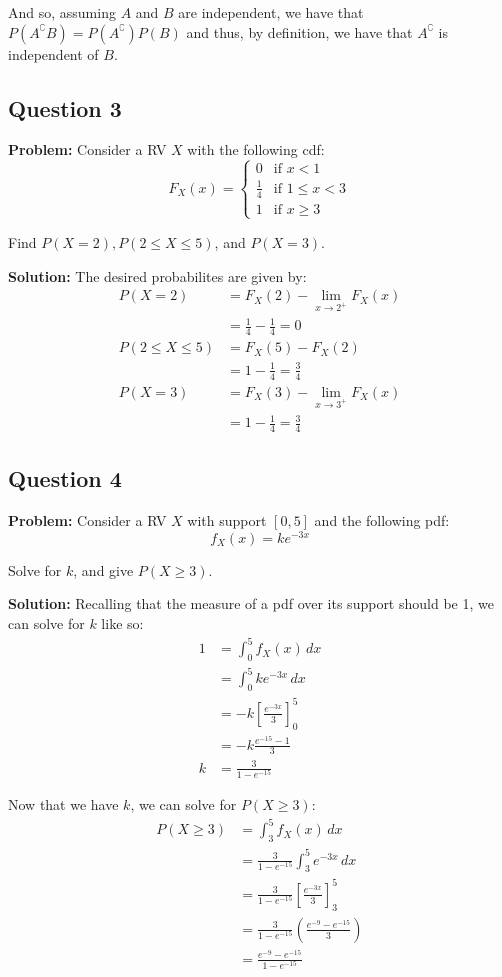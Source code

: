 \documentclass{article}
\newcommand*\eval[3]{\left[#1\right]_{#2}^{#3}}
\begin{document}
And so, assuming $A$ and $B$ are independent, we have that $P(A^\complement B)=P(A^\complement)P(B)$ and thus, by definition, we have that $A^\complement$ is independent of $B$.
\smallskip

\subsection*{Question 3}
\noindent\textbf{Problem:} Consider a RV $X$ with the following cdf:
$$F_X(x)=\begin{cases}
  0&\text{if }x<1\\
  \frac{1}{4}&\text{if }1\le x<3\\
  1&\text{if }x\ge3
\end{cases}$$

Find $P(X=2), P(2\le X\le5)$, and $P(X=3)$.
\smallskip

\noindent\textbf{Solution:} The desired probabilites are given by:
\begin{align*}
  P(X=2)&=F_X(2)-\lim_{x\to 2^+}F_X(x)\\
  &=\frac{1}{4}-\frac{1}{4}=\boxed{0}\\
  P(2\le X\le5)&=F_X(5)-F_X(2)\\
  &=1-\frac{1}{4}=\boxed{\frac{3}{4}}\\
  P(X=3)&=F_X(3)-\lim_{x\to 3^+}F_X(x)\\
  &=1-\frac{1}{4}=\boxed{\frac{3}{4}}
\end{align*}
\smallskip

\subsection*{Question 4}
\noindent\textbf{Problem:} Consider a RV $X$ with support $[0,5]$ and the following pdf:
$$f_X(x)=ke^{-3x}$$

Solve for $k$, and give $P(X\ge 3)$.
\bigskip

\noindent\textbf{Solution:} Recalling that the measure of a pdf over its support should be 1, we can solve for $k$ like so:
\begin{align*}
  1&=\int_0^5f_X(x)\,dx\\
  &=\int_0^5 ke^{-3x}\,dx\\
  &=-k\eval{\frac{e^{-3x}}{3}}{0}{5}\\
  &=-k\frac{e^{-15}-1}{3}\\
  k&=\boxed{\frac{3}{1-e^{-15}}}
\end{align*}

Now that we have $k$, we can solve for $P(X\ge 3)$:
\begin{align*}
  P(X\ge 3)&=\int_3^5 f_X(x)\,dx\\
  &=\frac{3}{1-e^{-15}}\int_3^5e^{-3x}\,dx\\
  &=\frac{3}{1-e^{-15}}\eval{\frac{e^{-3x}}{3}}{3}{5}\\
  &=\frac{3}{1-e^{-15}}\left(\frac{e^{-9}-e^{-15}}{3}\right)\\
  &=\boxed{\frac{e^{-9}-e^{-15}}{1-e^{-15}}}\\
\end{align*}
\smallskip
\end{document}
